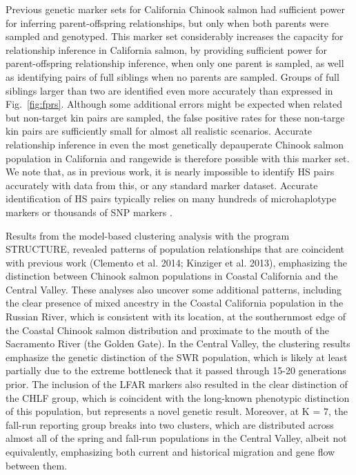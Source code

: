 

Previous genetic marker sets for California Chinook salmon had sufficient power for inferring
parent-offspring relationships, but only when both parents were sampled and genotyped.
This marker set considerably increases the capacity for relationship inference in California
salmon, by providing sufficient power for parent-offspring relationship inference, when only
one parent is sampled, as well as identifying pairs of full siblings when no parents are sampled.
Groups of full siblings larger than two are identified even more accurately than expressed in Fig.~\ref{fig:fprs}.
Although some additional errors might be
expected when related but non-target kin pairs are sampled,  the false positive rates
for these non-targe kin pairs are sufficiently small
for almost all realistic scenarios.
Accurate relationship
inference in even the most genetically depauperate Chinook salmon population in California
and rangewide \citep{seeb2007development,clemento2014evaluation} is therefore possible with this marker set.
We note that, as in previous work, it is nearly impossible to identify HS pairs accurately
with data from this, or any standard marker dataset. Accurate identification of HS pairs
typically relies on many hundreds of microhaplotype markers \citep{baetscher2018microhaplotypes} or thousands of SNP markers \citep{hillary2018genetic}. 

Results from the model-based clustering analysis with the program STRUCTURE, revealed patterns of population relationships that are
coincident with previous work (Clemento et al. 2014; Kinziger et al. 2013), emphasizing the distinction between Chinook salmon
populations in Coastal California and the Central Valley. These analyses also uncover some additional patterns, including the clear
presence of mixed ancestry in the Coastal California population in the Russian River, which is consistent with its location, at the 
southernmost edge of the Coastal Chinook salmon distribution and proximate to the mouth of the Sacramento River (the Golden Gate). In the
Central Valley, the clustering results emphasize the genetic distinction of the SWR population, which is likely at least partially due to 
the extreme bottleneck that it passed through 15-20 generations prior. The inclusion of the LFAR markers also resulted in the clear 
distinction of the CHLF group, which is coincident with the long-known phenotypic distinction of this population, but represents a novel 
genetic result. Moreover, at K = 7, the fall-run reporting group breaks into two clusters, which are distributed across almost all of the 
spring and fall-run populations in the Central Valley, albeit not equivalently, emphasizing both current and historical  migration and 
gene flow between them. 